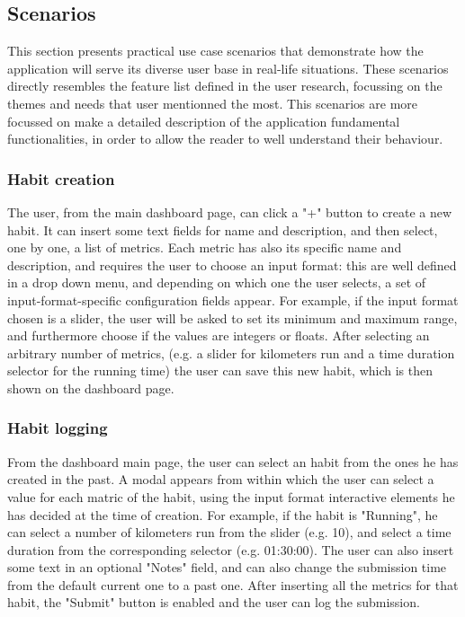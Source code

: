 \documentclass{article}
\begin{document}
\subsection{Scenarios}

This section presents practical use case scenarios that demonstrate how the application will serve its diverse user base in real-life situations.
These scenarios directly resembles the feature list defined in the user research, focussing on the themes and needs that user mentionned the most.
This scenarios are more focussed on make a detailed description of the application fundamental functionalities, in order to allow the reader to well understand their behaviour.

\subsubsection{Habit creation}

The user, from the main dashboard page, can click a "+" button to create a new habit.
It can insert some text fields for name and description, and then select, one by one, a list of metrics.
Each metric has also its specific name and description, and requires the user to choose an input format: this are well defined in a drop down menu, and depending on which one the user selects, a set of input-format-specific configuration fields appear.
For example, if the input format chosen is a slider, the user will be asked to set its minimum and maximum range, and furthermore choose if the values are integers or floats.
After selecting an arbitrary number of metrics, (e.g. a slider for kilometers run and a time duration selector for the running time) the user can save this new habit, which is then shown on the dashboard page.

\subsubsection{Habit logging}

From the dashboard main page, the user can select an habit from the ones he has created in the past.
A modal appears from within which the user can select a value for each matric of the habit, using the input format interactive elements he has decided at the time of creation.
For example, if the habit is "Running", he can select a number of kilometers run from the slider (e.g. 10), and select a time duration from the corresponding selector (e.g. 01:30:00).
The user can also insert some text in an optional "Notes" field, and can also change the submission time from the default current one to a past one.
After inserting all the metrics for that habit, the "Submit" button is enabled and the user can log the submission.
\end{document}

